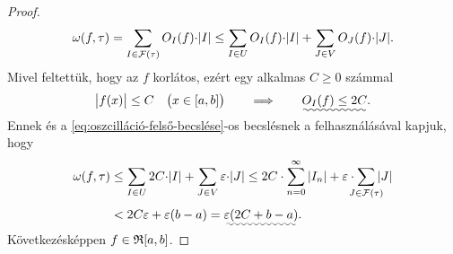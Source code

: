 \documentclass[
]{elteikthesis}[2024/04/26]
\begin{document}
\begin{proof}
		\[
			\omega(f, \tau) = 
			\sum_{I \in \mathcal{F}(\tau)} O_I (f) {\cdot} \abs{I} \leq
			\sum_{I \in U} O_I (f) {\cdot} \abs{I} + \sum_{J \in V} O_J (f) {\cdot} \abs{J}.
		\]
		Mivel feltettük, hogy az \( f \) korlátos, ezért egy alkalmas \( C \geq 0 \) számmal%
		\[
			\abs\big{f(x)} \leq C \quad \bigl( x \in [a, b] \bigr)
			\qquad \Longrightarrow \qquad
			\smash{\uwave{O_I(f) \leq 2C}}.
		\]
		Ennek és a \eqref{eq:oszcilláció-felső-becslése}-os becslésnek a felhasználásával kapjuk, hogy
		\begin{align*}
			\omega(f, \tau) &\leq 
			\sum_{I \in U} 2C          {\cdot} \abs{I} + 
			\sum_{J \in V} \varepsilon {\cdot} \abs{J}   \leq
			2C          \cdot \sum_{n=0}^{\infty} \abs{I_n} + 
			\varepsilon \cdot \sum_{\mathclap{J \in \mathcal{F}(\tau)}} \abs{J} \\[3pt] &<
			2C \varepsilon + \varepsilon (b - a) =
			\smash{\uwave{\varepsilon ( 2C + b - a )}}.
		\end{align*}
		Következésképpen \( f \in \mathfrak{R}{[a, b]} \).
	\end{proof}
\end{document}
